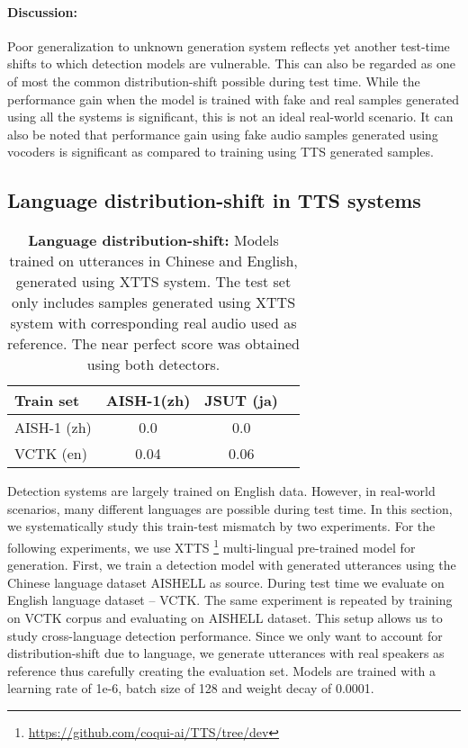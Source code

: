 \paragraph{Discussion:} Poor generalization to unknown generation system reflects yet another test-time shifts to which detection models are vulnerable. This can also be regarded as one of most the common distribution-shift possible during test time. While the performance gain when the model is trained with fake and real samples generated using all the systems is significant, this is not an ideal real-world scenario. It can also be noted that performance gain using fake audio samples generated using vocoders is significant as compared to training using TTS generated samples.


\subsection{Language distribution-shift in TTS systems}\label{sec:exp-10}
\begin{table}[ht!]
    \caption{\textbf{Language distribution-shift:} Models trained on utterances in Chinese and English, generated using XTTS system. The test set only includes samples generated using XTTS system with corresponding real audio used as reference. The near perfect score was obtained using both detectors.}
    \label{tab:lang_tts_1}
    \vskip 0.15in
\begin{center}
\begin{small}
\scriptsize
\begin{sc}
    \begin{tabular}{lccc}
      \toprule
    Train set & AISH-1(zh) & JSUT (ja) \\
  \hline 
  AISH-1 (zh) & 0.0 & 0.0\\ 
  \hline
  VCTK (en) & 0.04 & 0.06  \\ 
 \bottomrule 
    \end{tabular}
    \end{sc}
\end{small}
\end{center}
\vskip -0.1in
\end{table}
Detection systems are largely trained on English data. However, in real-world scenarios, many different languages are possible during test time. In this section, we systematically study this train-test mismatch by two experiments. For the following experiments, we use XTTS \footnote{\url{https://github.com/coqui-ai/TTS/tree/dev}} multi-lingual pre-trained model for generation. First, we train a detection model with generated utterances using the Chinese language dataset AISHELL as source. During test time we evaluate on English language dataset -- VCTK. The same experiment is repeated by training on VCTK corpus and evaluating on AISHELL dataset. This setup allows us to study cross-language detection performance. Since we only want to account for distribution-shift due to language, we generate utterances with real speakers as reference thus carefully creating the evaluation set. Models are trained with a learning rate of 1e-6, batch size of 128 and weight decay of 0.0001.


